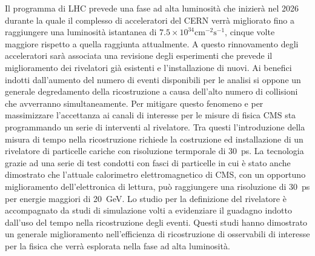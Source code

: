 Il programma di LHC prevede una fase ad alta luminosità che inizierà nel 2026
durante la quale il complesso di acceleratori del CERN verrà migliorato fino a raggiungere una luminosità
istantanea di $7.5\times10^{34}\mbox{cm}^{-2}\mbox{s}^{-1}$, cinque volte maggiore rispetto a quella raggiunta
attualmente. A questo rinnovamento degli acceleratori sarà associata una revisione degli
esperimenti che prevede il miglioramento dei rivelatori
già esistenti e l'installazione di nuovi.
Ai benefici indotti dall'aumento del numero di eventi disponibili per le analisi si oppone
un generale degredamento della ricostruzione a causa dell'alto numero di collisioni che avverranno
simultaneamente. Per mitigare questo fenomeno e per massimizzare l'accettanza ai canali di interesse
per le misure di fisica CMS sta programmando un serie di interventi al rivelatore.
Tra questi l'introduzione della misura di tempo nella ricostruzione richiede la costruzione ed
installazione di un rivelatore di particelle cariche con risoluzione termporale di 30~ps.
La tecnologia grazie ad una serie di test condotti con fasci di particelle in cui è stato anche dimostrato
che l'attuale calorimetro elettromagnetico di CMS, con un opportuno miglioramento dell'elettronica di lettura,
può raggiungere una risoluzione di 30~ps per energie maggiori di 20~GeV.
Lo studio per la definizione del rivelatore è accompagnato da studi di simulazione volti a evidenziare
il guadagno indotto dall'uso del tempo nella ricostruzione degli eventi. Questi studi hanno
dimostrato un generale miglioramento nell'efficienza di ricostruzione di osservabili di interesse
per la fisica che verrà esplorata nella fase ad alta luminosità.
